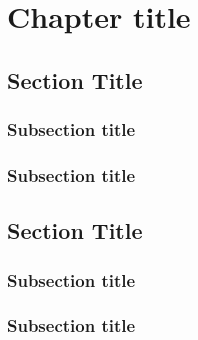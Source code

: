 \chapter{Chapter title}


\section{Section Title}

\subsection{Subsection title}
\subsection{Subsection title}

\section{Section Title}

\subsection{Subsection title}
\subsection{Subsection title}